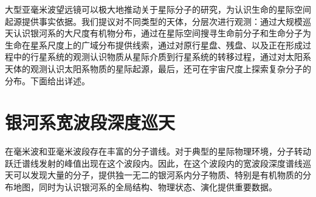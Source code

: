 \documentclass{report}
\begin{document}
大型亚毫米波望远镜可以极大地推动关于星际分子的研究，为认识生命的星际空间起源提供事实依据。我们提议对不同类型的天体，分层次进行观测：通过大规模巡天认识银河系的大尺度有机物分布，通过在星际空间搜寻生命前分子和生命分子为生命在星系尺度上的广域分布提供线索，通过对原行星盘、残盘、以及正在形成过程中的行星系统的观测认识物质从星际介质到行星系统的转移过程，通过对太阳系天体的观测认识太阳系物质的星际起源，最后，还可在宇宙尺度上探索复杂分子的分布。下面给出详述。

\section{银河系宽波段深度巡天}

在毫米波和亚毫米波段存在丰富的分子谱线。对于典型的星际物理环境，分子转动跃迁谱线发射的峰值出现在这个波段内。因此，在这个波段内的宽波段深度谱线巡天可以发现大量的分子，提供独一无二的银河系内分子物质、特别是有机物质的分布地图，同时为认识银河系的全局结构、物理状态、演化提供重要数据。
\end{document}

